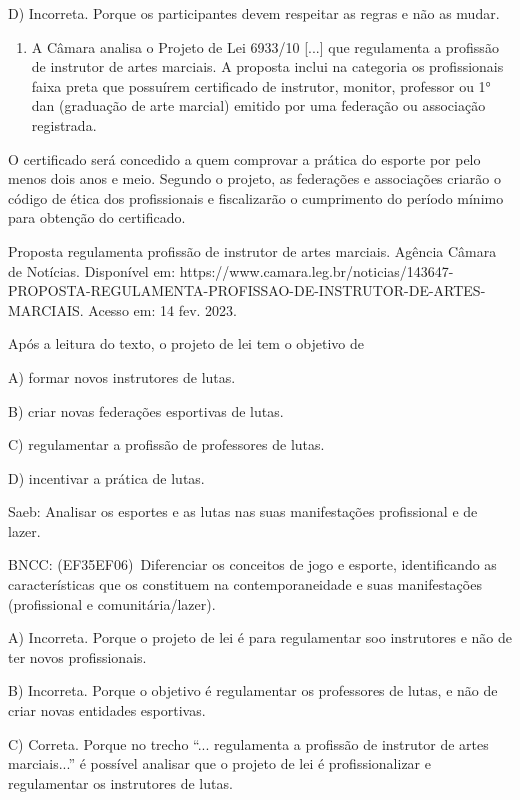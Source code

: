 D) Incorreta. Porque os participantes devem respeitar as regras e não as
mudar.

\begin{enumerate}
\def\labelenumi{\arabic{enumi}.}
\item
  A Câmara analisa o Projeto de Lei 6933/10 {[}...{]} que regulamenta a
  profissão de instrutor de artes marciais. A proposta inclui na
  categoria os profissionais faixa preta que possuírem certificado de
  instrutor, monitor, professor ou 1° dan (graduação de arte marcial)
  emitido por uma federação ou associação registrada.
\end{enumerate}

O certificado será concedido a quem comprovar a prática do esporte por
pelo menos dois anos e meio. Segundo o projeto, as federações e
associações criarão o código de ética dos profissionais e fiscalizarão o
cumprimento do período mínimo para obtenção do certificado.

Proposta regulamenta profissão de instrutor de artes marciais. Agência
Câmara de Notícias. Disponível em:
https://www.camara.leg.br/noticias/143647-PROPOSTA-REGULAMENTA-PROFISSAO-DE-INSTRUTOR-DE-ARTES-MARCIAIS.
Acesso em: 14 fev. 2023.

Após a leitura do texto, o projeto de lei tem o objetivo de

A) formar novos instrutores de lutas.

B) criar novas federações esportivas de lutas.

C) regulamentar a profissão de professores de lutas.

D) incentivar a prática de lutas.

Saeb: Analisar os esportes e as lutas nas suas manifestações
profissional e de lazer.

BNCC: (EF35EF06)~Diferenciar os conceitos de jogo e esporte,
identificando as características que os constituem na contemporaneidade
e suas manifestações (profissional e comunitária/lazer).

A) Incorreta. Porque o projeto de lei é para regulamentar soo
instrutores e não de ter novos profissionais.

B) Incorreta. Porque o objetivo é regulamentar os professores de lutas,
e não de criar novas entidades esportivas.

C) Correta. Porque no trecho ``... regulamenta a profissão de instrutor
de artes marciais...'' é possível analisar que o projeto de lei é
profissionalizar e regulamentar os instrutores de lutas.

